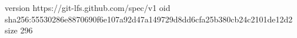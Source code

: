 version https://git-lfs.github.com/spec/v1
oid sha256:55530286e8870690f6e107a92d47a149729d8dd6cfa25b380cb24c2101de12d2
size 296
